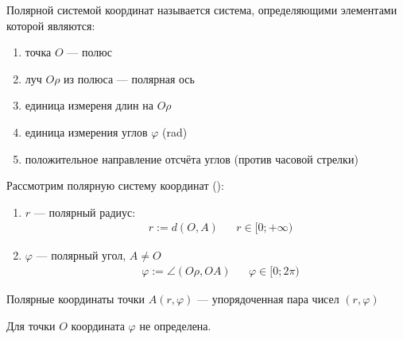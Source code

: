 \documentclass{article}
\begin{document}


\begin{minipage}{0.6\linewidth}
	Полярной системой координат называется система, определяющими элементами которой являются:
	\begin{enumerate}
		\item{}точка $O$ --- полюс
		\item{}луч $O\rho$ из полюса --- полярная ось
		\item{}единица измереня длин на $O\rho$
		\item{}единица измерения углов $\varphi$ (rad)
		\item{}положительное направление отсчёта углов (против часовой стрелки)
	\end{enumerate}
\end{minipage}%
\begin{minipage}{0.4\linewidth}
	\centering
	\label{9:polar}
\end{minipage}


Рассмотрим полярную систему координат ():
\begin{enumerate}
	\item{}$r$ --- полярный радиус:
	\begin{align*}
		 & r:=d(O,A) &  & r\in[0;+\infty)
	\end{align*}
	\item{}$\varphi$ --- полярный угол, $A\neq O$
	\begin{align*}
		 & \varphi:=\angle(O\rho,OA) &  & \varphi\in[0;2\pi)
	\end{align*}
\end{enumerate}

Полярные координаты точки $A(r,\varphi)$ --- упорядоченная пара чисел $(r,\varphi)$

Для точки $O$ координата $\varphi$ не определена.

\end{document}
